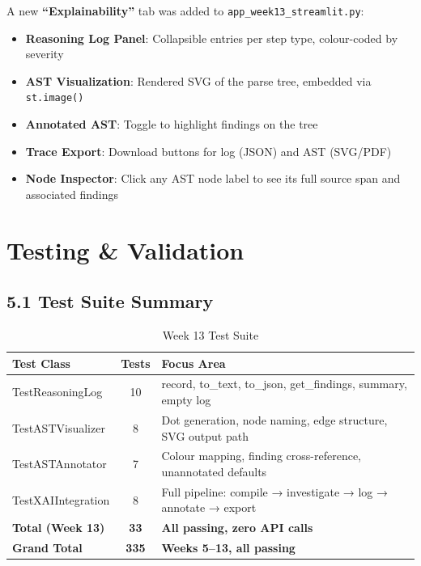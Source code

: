 \documentclass[a4paper,11pt]{article}
\begin{document}
A new \textbf{``Explainability''} tab was added to \texttt{app\_week13\_streamlit.py}:

\begin{itemize}[leftmargin=*]
    \item \textbf{Reasoning Log Panel}: Collapsible entries per step type, colour-coded by severity
    \item \textbf{AST Visualization}: Rendered SVG of the parse tree, embedded via \texttt{st.image()}
    \item \textbf{Annotated AST}: Toggle to highlight findings on the tree
    \item \textbf{Trace Export}: Download buttons for log (JSON) and AST (SVG/PDF)
    \item \textbf{Node Inspector}: Click any AST node label to see its full source span and associated findings
\end{itemize}

\section{Testing \& Validation}

\subsection{5.1 Test Suite Summary}

\begin{table}[h]
\centering
\begin{tabularx}{\textwidth}{|l|c|X|}
\hline
\rowcolor{teal!10}
\textbf{Test Class} & \textbf{Tests} & \textbf{Focus Area} \\
\hline
TestReasoningLog & 10 & record, to\_text, to\_json, get\_findings, summary, empty log \\
\hline
TestASTVisualizer & 8 & Dot generation, node naming, edge structure, SVG output path \\
\hline
TestASTAnnotator & 7 & Colour mapping, finding cross-reference, unannotated defaults \\
\hline
TestXAIIntegration & 8 & Full pipeline: compile → investigate → log → annotate → export \\
\hline
\textbf{Total (Week 13)} & \textbf{33} & \textbf{All passing, zero API calls} \\
\hline
\textbf{Grand Total} & \textbf{335} & \textbf{Weeks 5--13, all passing} \\
\hline
\end{tabularx}
\caption{Week 13 Test Suite}
\end{table}
\end{document}
